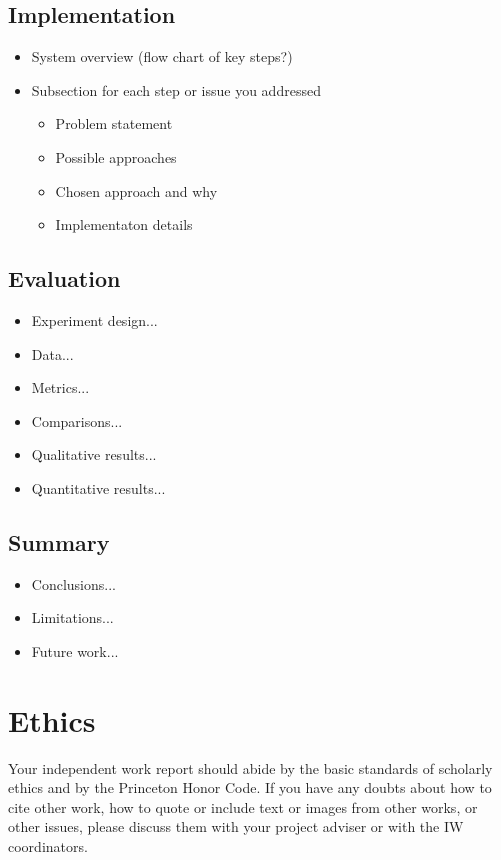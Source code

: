 \documentclass[pageno]{jpaper}
\begin{document}
\subsection{Implementation}
\begin{itemize}
\item System overview (flow chart of key steps?)
\item Subsection for each step or issue you addressed
\begin{itemize}
\item Problem statement
\item Possible approaches
\item Chosen approach and why
\item Implementaton details
\end{itemize}
\end{itemize}

\subsection{Evaluation}
\begin{itemize}
\item Experiment design...
\item Data...
\item Metrics...
\item Comparisons...
\item Qualitative results...
\item Quantitative results...
\end{itemize}

\subsection{Summary}
\begin{itemize}
\item Conclusions...
\item Limitations...
\item Future work...
\end{itemize}


\section{Ethics}

Your independent work report should abide by the basic standards of scholarly ethics and by the Princeton Honor Code. If you have any doubts about how to cite
other work, how to quote or include text or images from other works, or other issues, please discuss them with your project adviser or with the IW coordinators. 





\end{document}
